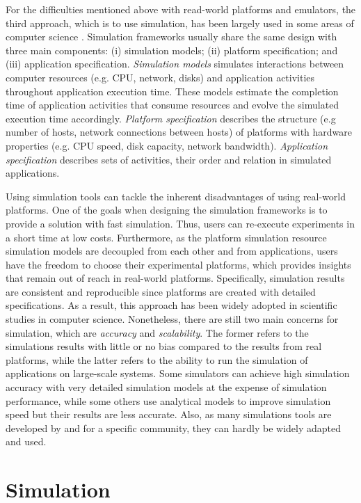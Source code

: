 For the difficulties mentioned above with read-world platforms 
and emulators, the third approach, which is to use simulation, has been  
largely used in some areas of computer science \cite{casanova2008simgrid}.  
Simulation frameworks usually share the same design with three main 
components: (i) simulation models; (ii) platform specification; 
and (iii) application specification.
\textit{Simulation models} simulates interactions between computer 
resources (e.g. CPU, network, disks) and application activities throughout 
application execution time. 
These models estimate the completion time of application activities 
that consume resources and evolve the simulated execution time accordingly.
\textit{Platform specification} describes the structure (e.g number of hosts, 
network connections between hosts) of platforms with hardware properties 
(e.g. CPU speed, disk capacity, network bandwidth).
\textit{Application specification} describes sets of activities, their order 
and relation in simulated applications.

Using simulation tools can tackle the inherent disadvantages of using 
real-world platforms. 
One of the goals when designing the simulation frameworks is to provide 
a solution with fast simulation. 
Thus, users can re-execute experiments in a short time at low costs.
Furthermore, as the platform simulation resource simulation models 
are decoupled from each other and from applications, users have 
the freedom to choose their experimental platforms, which provides
insights that remain out of reach in real-world platforms. 
Specifically, simulation results are consistent and reproducible since 
platforms are created with detailed specifications. 
As a result, this approach has been widely adopted in scientific studies
in computer science. 
Nonetheless, there are still two main concerns for simulation, which 
are \textit{accuracy} and \textit{scalability}. The former refers to the 
simulations results with little or no bias compared to the results from 
real platforms, while the latter refers to the ability to run the simulation 
of applications on large-scale systems. 
Some simulators can achieve high simulation accuracy with very detailed 
simulation models at the expense of simulation performance, while 
some others use analytical models to improve simulation speed but 
their results are less accurate.
Also, as many simulations tools are developed by and for a specific community, 
they can hardly be widely adapted and used.

\section{Simulation}

